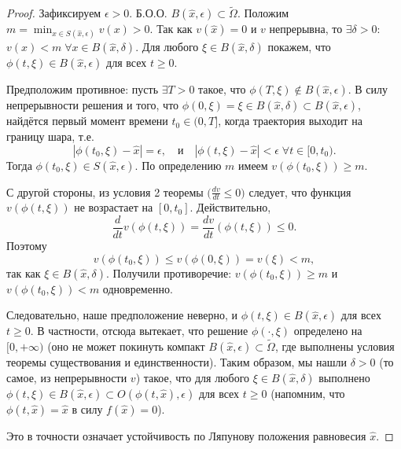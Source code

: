\begin{proof}
    Зафиксируем \(\epsilon > 0\). Б.О.О. \(B(\widehat{x}, \epsilon) \subset \widetilde{\Omega}\). Положим \(m = \min_{x \in S(\widehat{x}, \epsilon)} v(x) > 0\). Так как \(v(\widehat{x}) = 0\) и \(v\) непрерывна, то \(\exists \delta > 0\): \(v(x) < m \; \forall x \in B(\widehat{x}, \delta)\). Для любого \(\xi \in B(\widehat{x}, \delta)\) покажем, что \(\phi(t, \xi) \in B(\widehat{x}, \epsilon)\) для всех \(t \ge 0\).

    Предположим противное: пусть \(\exists T > 0\) такое, что \(\phi(T, \xi) \notin B(\widehat{x}, \epsilon)\). В силу непрерывности решения и того, что \(\phi(0, \xi) = \xi \in B(\widehat{x}, \delta) \subset B(\widehat{x}, \epsilon)\), найдётся первый момент времени \(t_0 \in (0, T]\), когда траектория выходит на границу шара, т.е.
    \[
    |\phi(t_0, \xi) - \widehat{x}| = \epsilon, \quad \text{и} \quad |\phi(t, \xi) - \widehat{x}| < \epsilon \; \forall t \in [0, t_0).
    \]
    Тогда \(\phi(t_0, \xi) \in S(\widehat{x}, \epsilon)\). По определению \(m\) имеем \(v(\phi(t_0, \xi)) \ge m\).

    С другой стороны, из условия 2 теоремы \(\bigl( \frac{dv}{dt} \le 0 \bigr)\) следует, что функция \(v(\phi(t, \xi))\) не возрастает на \([0, t_0]\). Действительно,
    \[
    \frac{d}{dt} v(\phi(t, \xi)) = \frac{dv}{dt}(\phi(t, \xi)) \le 0.
    \]
    Поэтому
    \[
    v(\phi(t_0, \xi)) \le v(\phi(0, \xi)) = v(\xi) < m,
    \]
    так как \(\xi \in B(\widehat{x}, \delta)\). Получили противоречие: \(v(\phi(t_0, \xi)) \ge m\) и \(v(\phi(t_0, \xi)) < m\) одновременно.

    Следовательно, наше предположение неверно, и \(\phi(t, \xi) \in B(\widehat{x}, \epsilon)\) для всех \(t \ge 0\). В частности, отсюда вытекает, что решение \(\phi(\cdot, \xi)\) определено на \([0, +\infty)\) (оно не может покинуть компакт \(B(\widehat{x}, \epsilon) \subset \widetilde{\Omega}\), где выполнены условия теоремы существования и единственности). Таким образом, мы нашли \(\delta > 0\) (то самое, из непрерывности \(v\)) такое, что для любого \(\xi \in B(\widehat{x}, \delta)\) выполнено \(\phi(t, \xi) \in B(\widehat{x}, \epsilon) \subset O(\phi(t, \widehat{x}), \epsilon)\) для всех \(t \ge 0\) (напомним, что \(\phi(t, \widehat{x}) = \widehat{x}\) в силу \(f(\widehat{x}) = 0\)).

    Это в точности означает устойчивость по Ляпунову положения равновесия \(\widehat{x}\).
\end{proof}

